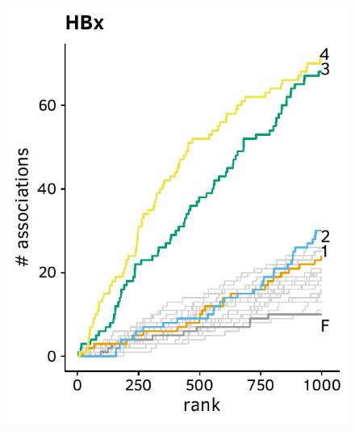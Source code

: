 \documentclass[a4paper,11pt]{article}
\begin{document}
\begin{figure}[H]
\begin{minipage}{.49\textwidth}
      \includegraphics[width=\linewidth]{plots/comparison_plots/hbv_duesseldorf/HBx_new_map.pdf}
    \end{minipage}%
  
    \vspace{0.5cm}
  

\end{figure}
\end{document}
